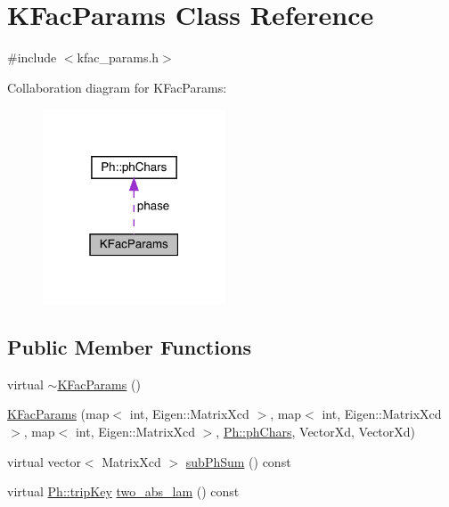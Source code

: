 \hypertarget{classKFacParams}{}\section{K\+Fac\+Params Class Reference}
\label{classKFacParams}


{\ttfamily \#include $<$kfac\+\_\+params.\+h$>$}



Collaboration diagram for K\+Fac\+Params\+:\nopagebreak
\begin{figure}[H]
\begin{center}
\leavevmode
\includegraphics[width=154pt]{dc/d62/classKFacParams__coll__graph}
\end{center}
\end{figure}
\subsection*{Public Member Functions}
\begin{DoxyCompactItemize}
\item 
virtual \mbox{\hyperlink{classKFacParams_a6fd85cbed3c5b08e892084759f12efbd}{$\sim$\+K\+Fac\+Params}} ()
\item 
\mbox{\hyperlink{classKFacParams_af8bd9e570a48e06e183f37a0dda441a4}{K\+Fac\+Params}} (map$<$ int, Eigen\+::\+Matrix\+Xcd $>$, map$<$ int, Eigen\+::\+Matrix\+Xcd $>$, map$<$ int, Eigen\+::\+Matrix\+Xcd $>$, \mbox{\hyperlink{structPh_1_1phChars}{Ph\+::ph\+Chars}}, Vector\+Xd, Vector\+Xd)
\item 
virtual vector$<$ Matrix\+Xcd $>$ \mbox{\hyperlink{classKFacParams_ac52a334fdecfea49db82683e194580a1}{sub\+Ph\+Sum}} () const
\item 
virtual \mbox{\hyperlink{namespacePh_afdd5bf3d7b37625115089ea3048e0cbb}{Ph\+::trip\+Key}} \mbox{\hyperlink{classKFacParams_a023894ddf4ee41134ce512a2bd2a8075}{two\+\_\+abs\+\_\+lam}} () const
\end{DoxyCompactItemize}
